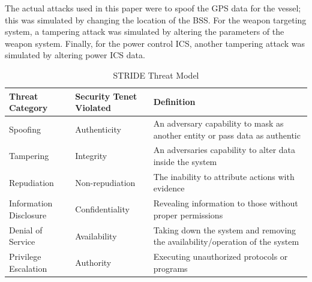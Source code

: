 \documentclass[conference]{IEEEtran}
\begin{document}
The actual attacks used in this paper were to spoof the GPS data for the vessel; this was simulated by changing the location of the BSS. For the weapon targeting system, a tampering attack was simulated by altering the parameters of the weapon system. Finally, for the power control ICS, another tampering attack was simulated by altering power ICS data.


\begin{table}
\centering
\caption{STRIDE Threat Model}
\label{tab:STRIDE}
\scriptsize 
\setlength{\tabcolsep}{2pt} 
\begin{tabular}{
  |>{\centering\arraybackslash}m{1.5cm}
  |>{\centering\arraybackslash}m{1.5cm}
  |>{\centering\arraybackslash}m{4cm}|}
\hline
Threat Category      & Security Tenet Violated & Definition                                                \\ \hline
Spoofing               & Authenticity    & An adversary capability to mask as another entity or pass data as authentic \\ \hline
Tampering            & Integrity               & An adversaries capability to alter data inside the system \\ \hline
Repudiation          & Non-repudiation         & The inability to attribute actions with evidence          \\ \hline
Information Disclosure & Confidentiality & Revealing information to those without proper permissions                     \\ \hline
Denial of Service      & Availability    & Taking down the system and removing the availability/operation of the system  \\ \hline
Privilege Escalation & Authority               & Executing unauthorized protocols or programs              \\ \hline
\end{tabular}%
\end{table}
\end{document}
